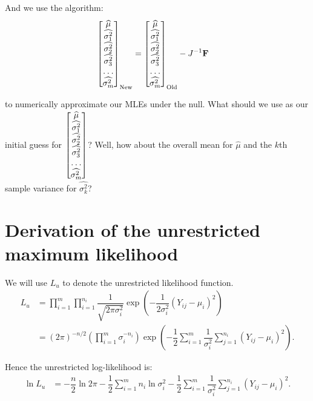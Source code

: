 \documentclass[12pt,a4paper]{article}
\newcommand{\wmu}{\widehat{\mu}}
\newcommand{\wst}[1]{\widehat{\sigma^2_{#1}}}
\begin{document}
	And we use the algorithm:
	\begin{align*}
		\left[\begin{matrix}
			\wmu \\
			\wst{1} \\
			\wst{2} \\
			\wst{3} \\
			\hdotsfor{1} \\
			\wst{m}
		\end{matrix}\right]_{\mathrm{New}} &= \left[\begin{matrix}
		\wmu \\
		\wst{1} \\
		\wst{2} \\
		\wst{3} \\
		\hdotsfor{1} \\
		\wst{m}
	\end{matrix}\right]_{\mathrm{Old}} - J^{-1}\mathbf{F}
	\end{align*}

	to numerically approximate our MLEs under the null. What should we use as our initial guess for $\left[\begin{matrix}
		\wmu \\
		\wst{1} \\
		\wst{2} \\
		\wst{3} \\
		\hdotsfor{1} \\
		\wst{m}
	\end{matrix}\right]$? Well, how about the overall mean for $\wmu$ and the $k$th sample variance for $\wst{k}$?

	\section{Derivation of the unrestricted maximum likelihood}
	We will use $L_u$ to denote the unrestricted likelihood function.
	\begin{align*}
		L_u &= \prod_{i=1}^m \prod_{i=1}^{n_i} \dfrac{1}{\sqrt{2\pi \sigma^2_i}} \exp{\left(-\dfrac{1}{2\sigma^2_i} (Y_{ij}-\mu_i)^2\right)} \\
		&= (2\pi)^{-n/2} \left(\prod_{i=1}^m \sigma_i^{-n_i}\right)\exp{\left(-\dfrac{1}{2}\sum_{i=1}^m \dfrac{1}{\sigma^2_i}\sum_{j=1}^{n_i} (Y_{ij}-\mu_i)^2\right)}.
	\end{align*}

	Hence the unrestricted log-likelihood is:
	\begin{align*}
		\ln{L_u} &= -\dfrac{n}{2} \ln{2\pi} - \dfrac{1}{2}\sum_{i=1}^m n_i \ln{\sigma^2_i} - \dfrac{1}{2}\sum_{i=1}^m \dfrac{1}{\sigma^2_i}\sum_{j=1}^{n_i} (Y_{ij}-\mu_i)^2.
	\end{align*}
\end{document}
